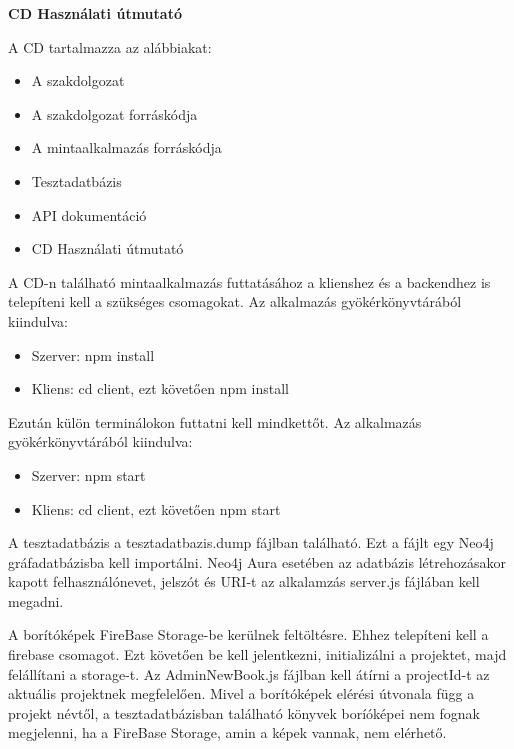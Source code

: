 \pagestyle{empty}

\noindent \textbf{\Large CD Használati útmutató}

\vskip 1cm

\noindent A CD tartalmazza az alábbiakat:
\begin{itemize}
    \item A szakdolgozat
    \item A szakdolgozat forráskódja
    \item A mintaalkalmazás forráskódja
    \item Tesztadatbázis
    \item API dokumentáció
    \item CD Használati útmutató
\end{itemize}

\bigskip

A CD-n található mintaalkalmazás futtatásához a klienshez és a backendhez is telepíteni kell a szükséges csomagokat. Az alkalmazás gyökérkönyvtárából kiindulva:
\begin{itemize}
    \item Szerver: npm install
    \item Kliens: cd client, ezt követően npm install
\end{itemize}

Ezután külön terminálokon futtatni kell mindkettőt. Az alkalmazás gyökérkönyvtárából kiindulva:
\begin{itemize}
    \item Szerver: npm start
    \item Kliens: cd client, ezt követően npm start
\end{itemize}

A tesztadatbázis a tesztadatbazis.dump fájlban található. Ezt a fájlt egy Neo4j gráfadatbázisba kell importálni. Neo4j Aura esetében az adatbázis létrehozásakor kapott felhasználónevet, jelszót és URI-t az alkalamzás server.js fájlában kell megadni. 

\bigskip

A borítóképek FireBase Storage-be kerülnek feltöltésre. Ehhez telepíteni kell a firebase csomagot. Ezt követően be kell jelentkezni, initializálni a projektet, majd felállítani a storage-t. Az AdminNewBook.js fájlban kell átírni a projectId-t az aktuális projektnek megfelelően. Mivel a borítóképek elérési útvonala függ a projekt névtől, a tesztadatbázisban található könyvek boríóképei nem fognak megjelenni, ha a FireBase Storage, amin a képek vannak, nem elérhető.
